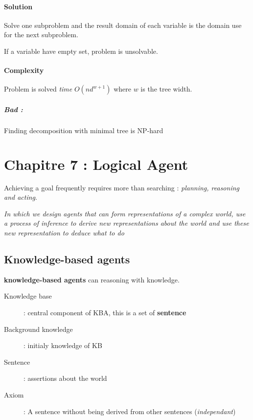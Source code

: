 \paragraph{Solution} Solve one subproblem and the result domain of each
variable is the domain use for the next subproblem.

If a variable have empty set, problem is unsolvable.

\paragraph{Complexity}
Problem is solved \textit{time} $O(nd^{w+1})$ where $w$ is the tree width.

\subparagraph{Bad :} Finding decomposition with minimal tree is NP-hard


\section{Chapitre 7 : Logical Agent}
Achieving a goal frequently requires more than searching : \textit{planning,
reasoning and acting}.

\textit{In which we design agents that can form representations of a complex world, use a process of inference to derive new representations about the world and use these new representation to deduce what to do}

\subsection{Knowledge-based agents}

\textbf{knowledge-based agents} can reasoning with knowledge.

\begin{description}
    \item[Knowledge base] : central component of KBA, this is a set of \textbf{sentence}
    \item[Background knowledge] : initialy knowledge of KB
    \item[Sentence] : assertions about the world
    \item[Axiom] : A sentence without being derived from other sentences (\textit{independant})
\end{description}

